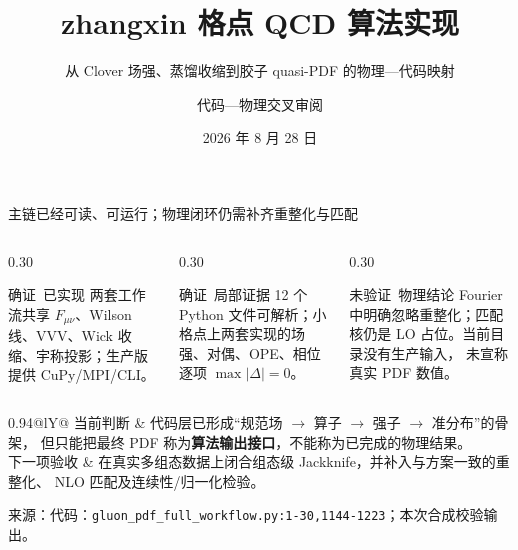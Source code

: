 \documentclass[UTF8,aspectratio=169,11pt]{ctexbeamer}
\title[zhangxin 格点 QCD 实现]{zhangxin 格点 QCD 算法实现}
\subtitle{从 Clover 场强、蒸馏收缩到胶子 quasi-PDF 的物理—代码映射}
\author[代码—物理解析]{代码—物理交叉审阅}
\institute{PyQCD / lattice-pdf：\codepath{refer/zhangxin}}
\date{2026 年 8 月 28 日}
\newcommand{\source}[1]{%
  \vspace{0.06em}\par{\raggedright\scriptsize\color{muted}来源：#1\par}}
\newcommand{\verified}{\textcolor{evidence}{确证}}
\newcommand{\unverified}{\textcolor{warning}{未验证}}
\newcommand{\codepath}[1]{\nolinkurl{#1}}
\begin{document}
\begin{frame}[plain]
  \titlepage
\end{frame}

\begin{frame}[t]{主链已经可读、可运行；物理闭环仍需补齐重整化与匹配}
  \begin{columns}[T,totalwidth=\textwidth]
    \begin{column}{0.30\textwidth}
      \begin{block}{\verified\ 已实现}
        两套工作流共享
        \(F_{\mu\nu}\)、Wilson 线、VVV、Wick 收缩、宇称投影；生产版提供
        CuPy/MPI/CLI。
      \end{block}
    \end{column}
    \begin{column}{0.30\textwidth}
      \begin{block}{\verified\ 局部证据}
        12 个 Python 文件可解析；小格点上两套实现的场强、对偶、OPE、相位逐项
        \(\max|\Delta|=0\)。
      \end{block}
    \end{column}
    \begin{column}{0.30\textwidth}
      \begin{block}{\unverified\ 物理结论}
        Fourier 中明确忽略重整化；匹配核仍是 LO 占位。当前目录没有生产输入，
        未宣称真实 PDF 数值。
      \end{block}
    \end{column}
  \end{columns}
  \vspace{0.18cm}
  \begin{center}
    \begin{tabularx}{0.94\textwidth}{@{}lY@{}}
      \toprule
      当前判断 & 代码层已形成“规范场 \(\to\) 算子 \(\to\) 强子 \(\to\) 准分布”的骨架，
      但只能把最终 PDF 称为\textbf{算法输出接口}，不能称为已完成的物理结果。\\
      下一项验收 & 在真实多组态数据上闭合组态级 Jackknife，并补入与方案一致的重整化、
      NLO 匹配及连续性/归一化检验。\\
      \bottomrule
    \end{tabularx}
  \end{center}
  \source{代码：\codepath{gluon_pdf_full_workflow.py:1-30,1144-1223}；本次合成校验输出。}
\end{frame}
\end{document}
